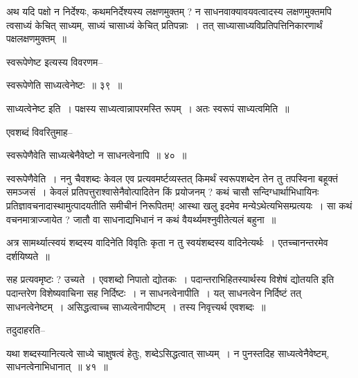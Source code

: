 \documentclass[article,12pt,a4paper]{memoir}
\begin{document}
	अथ यदि पक्षो न निर्देश्यः, कथमनिर्देश्यस्य लक्षणमुक्तम् ? न साधनवाक्यावयवत्वादस्य लक्षणमुक्तमपि त्वसाध्यं केचित् साध्यम्, साध्यं चासाध्यं केचित् प्रतिपन्नाः । तत् साध्यासाध्यविप्रतिपत्तिनिकारणार्थं पक्षलक्षणमुक्तम् ॥  
	  
	स्वरूपेणेष्ट इत्यस्य विवरणम--  
	  
	स्वरूपेणेति साध्यत्वेनेष्टः ॥ ३९ ॥ 
	  
	साध्यत्वेनेष्ट इति । पक्षस्य साध्यत्वान्नापरमस्ति रूपम् । अतः स्वरूपं साध्यत्वमिति ॥  
	  
	एवशब्दं विवरितुमाह--  
	  
	स्वरूपेणैवेति साध्यत्बेनैवेष्टो न साधनत्वेनापि ॥ ४० ॥ 
	  
	स्वरूपेणैवेति । ननु चैवशब्दः केवल एव प्रत्यवमर्ष्टव्यस्तत् किमर्थं स्वरूपशब्देन तेन तु तपस्विना बहूक्तं समञ्जसं । केवलं प्रतिपत्तुराश्वासेनैवोत्पादितेन किं प्रयोजनम् ? कथं चासौ सन्दिग्धार्थाभिधायिनः प्रतिज्ञावचनादास्थामुत्पादयतीति समीचीनं निरूपितम्! आस्था खलु इदमेव मन्येऽथेत्यभिसम्प्रत्ययः । सा कथं वचनमात्राज्जायेत ? जातौ वा साधनाद्यभिधानं न कथं वैयर्थ्यमश्नुवीतेत्यलं बहुना ॥
	\pend
      

	  \pstart अत्र सामर्थ्यात्स्वयं शब्दस्य वादिनेति विवृतिः कृता न तु स्वयंशब्दस्य वादिनेत्यर्थः । एतच्चानन्तरमेव दर्शयिष्यते ॥
	\pend
	  \bigskip
	  \begingroup
	

	  \pstart सह प्रत्यवमृष्टः ? उच्यते । एवशब्दो निपातो द्योतकः । पदान्तराभिहितस्यार्थस्य विशेषं द्योतयति इति पदान्तरेण विशेष्यवाचिना सह निर्दिष्टः । न साधनत्वेनापीति । यत् साधनत्वेन निर्दिष्टं तत् साधनत्वेनेष्टम् । असिद्धत्वाच्च साध्यत्वेनापीष्टम् । तस्य निवृत्त्यर्थ एवशब्दः ॥
	\pend
        

	  \pstart तदुदाहरति--
	\pend
        
	  \bigskip
	  \begingroup
	

	  \pstart यथा शब्दस्यानित्यत्वे साध्ये चाक्षुषत्वं हेतुः, शब्देऽसिद्धत्वात् साध्यम् । न पुनस्तदिह साध्यत्वेनैवेष्टम्, साधनत्वेनाभिधानात् ॥ ४१ ॥
	\pend
      
\end{document}
